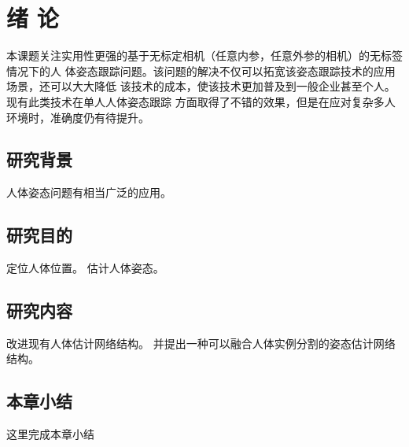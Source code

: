 \chapter{绪 论}
\label{cha:intro}


本课题关注实用性更强的基于无标定相机（任意内参，任意外参的相机）的无标签情况下的人
体姿态跟踪问题。该问题的解决不仅可以拓宽该姿态跟踪技术的应用场景，还可以大大降低
该技术的成本，使该技术更加普及到一般企业甚至个人。现有此类技术在单人人体姿态跟踪
方面取得了不错的效果，但是在应对复杂多人环境时，准确度仍有待提升。\cite{Cao2016Realtime}

\section{研究背景}
\label{sec:generalbackground}
人体姿态问题有相当广泛的应用。

\section{研究目的}
\label{sec:generalmotivation}
定位人体位置。
估计人体姿态。

\section{研究内容}
\label{sec:generalfield}
改进现有人体估计网络结构。
并提出一种可以融合人体实例分割的姿态估计网络结构。

\section{本章小结}
这里完成本章小结